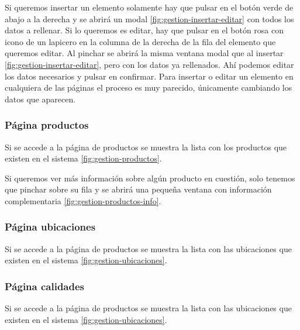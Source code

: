 Si queremos insertar un elemento solamente hay que pulsar en el botón verde de abajo a la derecha y se abrirá un modal \ref{fig:gestion-insertar-editar} con todos los datos a rellenar. Si lo queremos es editar, hay que pulsar en el botón rosa con icono de un lapicero en la columna de la derecha de la fila del elemento que queremos editar. Al pinchar se abrirá la misma ventana modal que al insertar \ref{fig:gestion-insertar-editar}, pero con los datos ya rellenados. Ahí podemos editar los datos necesarios y pulsar en confirmar.  
Para insertar o editar un elemento en cualquiera de las páginas el proceso es muy parecido, únicamente cambiando los datos que aparecen. 


\subsubsection{Página productos}

Si se accede a la página de productos se muestra la lista con los productos que existen en el sistema \ref{fig:gestion-productos}.


Si queremos ver más información sobre algún producto en cuestión, solo tenemos que pinchar sobre su fila y se abrirá una pequeña ventana con información complementaria \ref{fig:gestion-productos-info}.


\subsubsection{Página ubicaciones}

Si se accede a la página de productos se muestra la lista con las ubicaciones que existen en el sistema \ref{fig:gestion-ubicaciones}.


\subsubsection{Página calidades}

Si se accede a la página de productos se muestra la lista con las ubicaciones que existen en el sistema \ref{fig:gestion-ubicaciones}.


